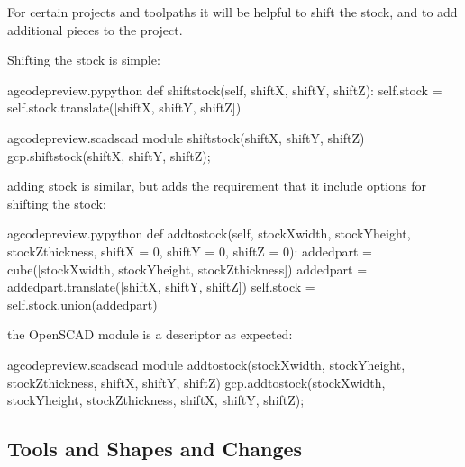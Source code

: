 \documentclass{ltxdoc}
\begin{document}
For certain projects and toolpaths it will be helpful to shift the stock, and to add additional pieces to the project.

Shifting the stock is simple:

\lstset{firstnumber=\thegcpy}
\begin{writecode}{a}{gcodepreview.py}{python}
    def shiftstock(self, shiftX, shiftY, shiftZ):
         self.stock = self.stock.translate([shiftX, shiftY, shiftZ])
        
\end{writecode}
\addtocounter{gcpy}{3}

\lstset{firstnumber=\thegcpscad}
\begin{writecode}{a}{gcodepreview.scad}{scad}
module shiftstock(shiftX, shiftY, shiftZ) {
    gcp.shiftstock(shiftX, shiftY, shiftZ);
}

\end{writecode}
\addtocounter{gcpscad}{4}

\noindent adding stock is similar, but adds the requirement that it include options for shifting the stock:

\lstset{firstnumber=\thegcpy}
\begin{writecode}{a}{gcodepreview.py}{python}
    def addtostock(self, stockXwidth, stockYheight, stockZthickness, 
                         shiftX = 0, 
                         shiftY = 0, 
                         shiftZ = 0):
         addedpart = cube([stockXwidth, stockYheight, stockZthickness])
         addedpart = addedpart.translate([shiftX, shiftY, shiftZ])
         self.stock = self.stock.union(addedpart)
        
\end{writecode}
\addtocounter{gcpy}{8}

\noindent the OpenSCAD module is a descriptor as expected:

\lstset{firstnumber=\thegcpscad}
\begin{writecode}{a}{gcodepreview.scad}{scad}
module addtostock(stockXwidth, stockYheight, stockZthickness, shiftX, shiftY, shiftZ) {
    gcp.addtostock(stockXwidth, stockYheight, stockZthickness, shiftX, shiftY, shiftZ);
}

\end{writecode}
\addtocounter{gcpscad}{4}

\subsection{Tools and Shapes and Changes}
\end{document}
